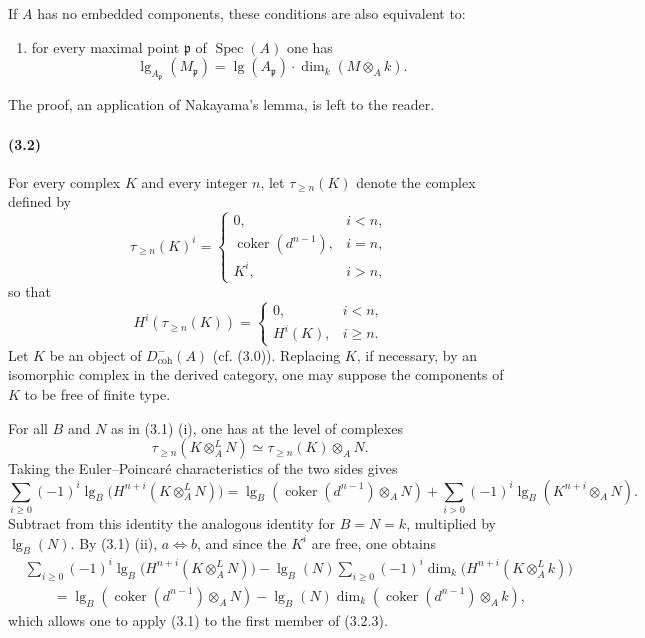 \documentclass[10pt]{article}
\providecommand{\Spec}{\operatorname{Spec}}
\providecommand{\lgop}{\operatorname{lg}}
\providecommand{\coker}{\operatorname{coker}}
\begin{document}
If $A$ has no embedded components, these conditions are also equivalent to:
\begin{enumerate}[label=\alph*),start=5]
\item for every maximal point $\mathfrak p$ of $\Spec(A)$ one has
\[
\tag{3.1.2'}
\lgop_{A_\mathfrak p}(M_\mathfrak p)=\lgop(A_\mathfrak p)\cdot
\dim_k(M\otimes_A k).
\]
\end{enumerate}
The proof, an application of Nakayama's lemma, is left to the reader.

\paragraph{(3.2)} For every complex $K$ and every integer $n$, let $\tau_{\ge n}(K)$ denote the complex defined by
\[
\tag{3.2.1}
\tau_{\ge n}(K)^i=
\begin{cases}
0,& i<n,\\
\coker(d^{n-1}),& i=n,\\
K^i,& i>n,
\end{cases}
\]
so that
\[
\tag{3.2.2}
H^i(\tau_{\ge n}(K))=
\begin{cases}
0,& i<n,\\
H^i(K),& i\ge n.
\end{cases}
\]
Let $K$ be an object of $D^-_{\mathrm{coh}}(A)$ (cf. (3.0)). Replacing $K$, if necessary, by an isomorphic complex in the derived category, one may suppose the components of $K$ to be free of finite type.

For all $B$ and $N$ as in (3.1) (i), one has at the level of complexes
\[
\tau_{\ge n}(K\otimes_A^L N)\simeq\tau_{\ge n}(K)\otimes_A N.
\]
Taking the Euler--Poincaré characteristics of the two sides gives
\[
\sum_{i\ge0}(-1)^i\lgop_B\bigl(H^{n+i}(K\otimes_A^L N)\bigr)
=\lgop_B(\coker(d^{n-1})\otimes_A N)+
\sum_{i>0}(-1)^i\lgop_B(K^{n+i}\otimes_A N).
\]
Subtract from this identity the analogous identity for $B=N=k$, multiplied by $\lgop_B(N)$. By (3.1) (ii), $a\Leftrightarrow b$, and since the $K^i$ are free, one obtains
\[
\tag{3.2.3}
\begin{aligned}
&\sum_{i\ge0}(-1)^i\lgop_B\bigl(H^{n+i}(K\otimes_A^L N)\bigr)
-\lgop_B(N)\sum_{i\ge0}(-1)^i\dim_k\bigl(H^{n+i}(K\otimes_A^L k)\bigr)\\
&\qquad=\lgop_B(\coker(d^{n-1})\otimes_A N)
-\lgop_B(N)\dim_k(\coker(d^{n-1})\otimes_A k),
\end{aligned}
\]
which allows one to apply (3.1) to the first member of (3.2.3).
\end{document}

